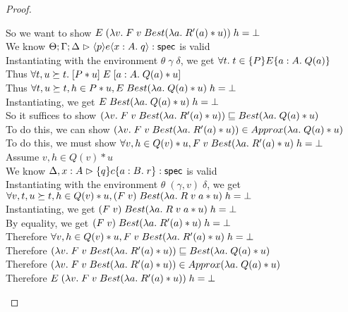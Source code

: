 \begin{proof}
\begin{tabbedproof}
    \ooooooo So we want to show $E\;(\semfun{v}{F\;v\;Best(\semfun{a}{R'(a)*u})})\;h = \bot$ \\
    \ooooooo We know $\judgeS{\mspec{p}{e}{x:A}{q}}$ is valid \\
    \ooooooo Instantiating with the environment $\theta\;\gamma\;\delta$, we get $\forall t.\; t \in \spec{P}{E}{a:A}{Q(a)}$ \\
    \ooooooo Thus $\forall t, u \succeq t.\; \basicspec{P * u}{E}{a:A}{Q(a) * u}$ \\
    \ooooooo Thus $\forall t, u \succeq t, h \in P * u, E\;Best(\semfun{a}{Q(a) * u})\;h = \bot$ \\
    \ooooooo Instantiating, we get $E\;Best(\semfun{a}{Q(a) * u})\;h = \bot$ \\
    \ooooooo So it suffices to show $(\semfun{v}{F\;v\;Best(\semfun{a}{R'(a)*u})}) \sqsubseteq 
                                Best(\semfun{a}{Q(a) * u})$ \\
    \ooooooo To do this, we can show $(\semfun{v}{F\;v\;Best(\semfun{a}{R'(a)*u})}) \in Approx(\semfun{a}{Q(a) * u})$ \\
    \ooooooo To do this, we must show $\forall v, h \in Q(v) * u, F\;v\;Best(\semfun{a}{R'(a)*u})\;h = \bot$ \\
    \ooooooo Assume $v, h \in Q(v) * u$ \\
    \oooooooo We know $\judgeS[\Delta,x:A]{\spec{q}{c}{a:B}{r}}$ is valid\\
    \oooooooo Instantiating with the environment $\theta\;(\gamma, v)\;\delta$, we get \\
    \oooooooox $\forall v, t, u \succeq t, h \in Q(v) * u, (F\;v)\;Best(\semfun{a}{R\;v\;a * u})\;h = \bot$ \\
    \oooooooo Instantiating, we get $(F\;v)\;Best(\semfun{a}{R\;v\;a * u})\;h = \bot$ \\
    \oooooooo By equality, we get $(F\;v)\;Best(\semfun{a}{R'(a) * u})\;h = \bot$ \\
    \ooooooo Therefore $\forall v, h \in Q(v) * u, F\;v\;Best(\semfun{a}{R'(a)*u})\;h = \bot$ \\
    \ooooooo Therefore $(\semfun{v}{F\;v\;Best(\semfun{a}{R'(a)*u})}) \sqsubseteq 
                                Best(\semfun{a}{Q(a) * u})$ \\
    \ooooooo Therefore $(\semfun{v}{F\;v\;Best(\semfun{a}{R'(a)*u})}) \in Approx(\semfun{a}{Q(a) * u})$ \\                        
    \ooooooo Therefore $E\;(\semfun{v}{F\;v\;Best(\semfun{a}{R'(a)*u})})\;h = \bot$ \\

\end{tabbedproof}
\end{proof}
